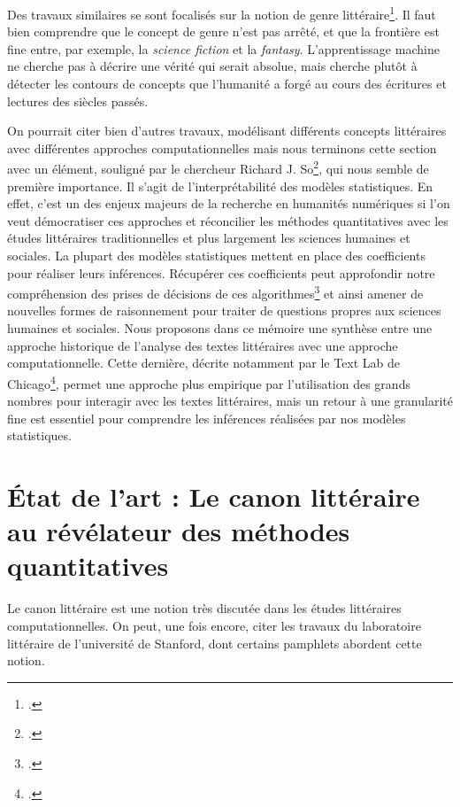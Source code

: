Des travaux similaires se sont focalisés sur la notion de genre littéraire\footcites{underwood_mapping_2013}. Il faut bien comprendre que le concept de genre n'est pas arrêté, et que la frontière est fine entre, par exemple, la \textit{science fiction} et la \textit{fantasy}. L'apprentissage machine ne cherche pas à décrire une vérité qui serait absolue, mais cherche plutôt à détecter les contours de concepts que l'humanité a forgé au cours des écritures et lectures des siècles passés. 

On pourrait citer bien d'autres travaux, modélisant différents concepts littéraires avec différentes approches computationnelles mais nous terminons cette section avec un élément, souligné par le chercheur Richard J. So\footcites{long_literary_2016}, qui nous semble de première importance. Il s'agit de l'interprétabilité des modèles statistiques. En effet, c'est un des enjeux majeurs de la recherche en humanités numériques si l'on veut démocratiser ces approches et réconcilier les méthodes quantitatives avec les études littéraires traditionnelles et plus largement les sciences humaines et sociales. La plupart des modèles statistiques mettent en place des coefficients pour réaliser leurs inférences. Récupérer ces coefficients peut approfondir notre compréhension des prises de décisions de ces algorithmes\footcites{ribeiro_why_2016} et ainsi amener de nouvelles formes de raisonnement pour traiter de questions propres aux sciences humaines et sociales. Nous proposons dans ce mémoire une synthèse entre une approche historique de l'analyse des textes littéraires avec une approche computationnelle. Cette dernière, décrite notamment par le Text Lab de Chicago\footcites{long_literary_2016}, permet une approche plus empirique par l'utilisation des grands nombres pour interagir avec les textes littéraires, mais un retour à une granularité fine est essentiel pour comprendre les inférences réalisées par nos modèles statistiques.


\bigskip 

\section{État de l'art : Le canon littéraire au révélateur des méthodes quantitatives}

Le canon littéraire est une notion très discutée dans les études littéraires computationnelles. On peut, une fois encore, citer les travaux du laboratoire littéraire de l'université de Stanford, dont certains pamphlets abordent cette notion. 

